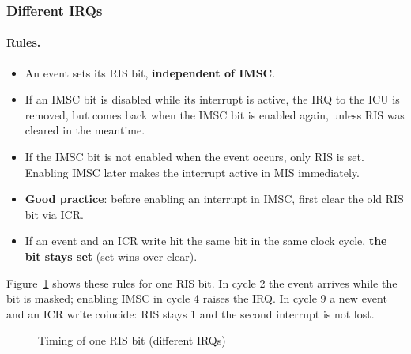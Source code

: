 \subsubsection{Different IRQs}
\label{subsubsec:archirqflowdiff}

\paragraph{Rules.}
\begin{itemize}
  \item An event sets its RIS bit, \textbf{independent of IMSC}.
  \item If an IMSC bit is disabled while its interrupt is active, the IRQ to the
    ICU is removed, but comes back when the IMSC bit is enabled again, unless
    RIS was cleared in the meantime.
  \item If the IMSC bit is not enabled when the event occurs, only RIS is set.
    Enabling IMSC later makes the interrupt active in MIS immediately.
  \item \textbf{Good practice}: before enabling an interrupt in IMSC, first clear
    the old RIS bit via ICR.
  \item If an event and an ICR write hit the same bit in the same clock cycle,
    \textbf{the bit stays set} (set wins over clear).
\end{itemize}

Figure~\ref{fig:archirq04} shows these rules for one RIS bit. In cycle 2 the
event arrives while the bit is masked; enabling IMSC in cycle 4 raises the IRQ.
In cycle 9 a new event and an ICR write coincide: RIS stays 1 and the second
interrupt is not lost.

\begin{figure}[H]
\centering
{}
\caption{Timing of one RIS bit (different IRQs)}
\label{fig:archirq04}
\end{figure}

